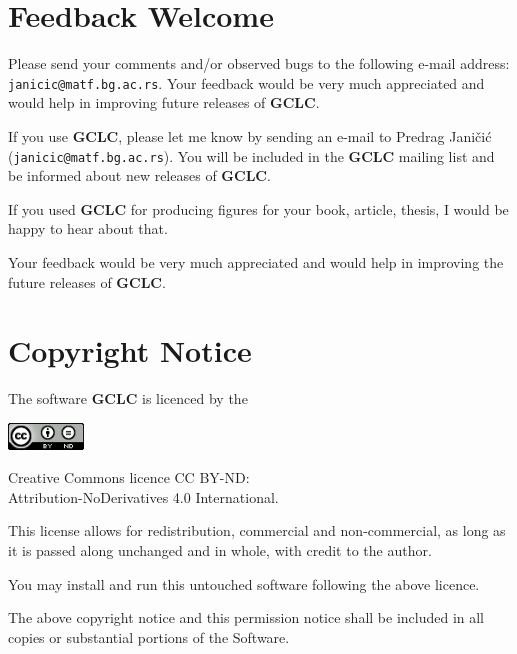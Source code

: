 \documentclass[a4paper]{book}
\newcommand{\gclc}{{\bfseries GCLC}\xspace}
\begin{document}
\section{Feedback Welcome}

Please send your comments and/or observed bugs to the following
e-mail address: \verb|janicic@matf.bg.ac.rs|. Your feedback would
be very much appreciated and would help in improving future
releases of \gclc.

If you use \gclc, please let me know by sending an e-mail to
Predrag Janičić (\verb|janicic@matf.bg.ac.rs|). You
will be included in the \gclc mailing list and be informed about
new releases of \gclc.

If you used \gclc for producing figures for your book, article,
thesis, I would be happy to hear about that.

Your feedback would be very much appreciated and would help in
improving the future releases of \gclc.


\section{Copyright Notice}

The software \gclc is licenced by the

\begin{center}
\includegraphics[width=0.15\textwidth]{figures/CC-BY-ND.png}
\begin{minipage}{8cm}
Creative Commons licence  CC BY-ND: \\ Attribution-NoDerivatives 4.0 International.   
\end{minipage}
\end{center}

\noindent
This license allows for redistribution, commercial and non-commercial, 
as long as it is passed along unchanged and in whole, with credit to 
the author. 

You may install and run this untouched software following the 
above licence.

The above copyright notice and this permission notice shall be 
included in all copies or substantial portions of the Software.
\end{document}
